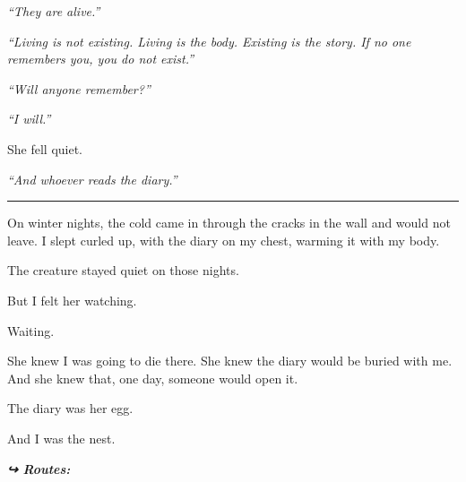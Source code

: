 \noindent \textit{\textquotedblleft{}They are alive.\textquotedblright{}}

\noindent \textit{\textquotedblleft{}Living is not existing. Living is the body. Existing is the story. If no one remembers you, you do not exist.\textquotedblright{}}

\noindent \textit{\textquotedblleft{}Will anyone remember?\textquotedblright{}}

\noindent \textit{\textquotedblleft{}I will.\textquotedblright{}}

\noindent She fell quiet.

\noindent \textit{\textquotedblleft{}And whoever reads the diary.\textquotedblright{}}

\vspace{0.5em}\noindent\rule{\textwidth}{0.5pt}\vspace{0.5em}

\noindent On winter nights, the cold came in through the cracks in the wall and would not leave. I slept curled up, with the diary on my chest, warming it with my body.

\noindent The creature stayed quiet on those nights.

\noindent But I felt her watching.

\noindent Waiting.

\noindent She knew I was going to die there. She knew the diary would be buried with me. And she knew that, one day, someone would open it.

\noindent The diary was her egg.

\noindent And I was the nest.

\vspace{0.5em}
\noindent\textit{\textbf{↪ Routes:}  \rotasep {}}
